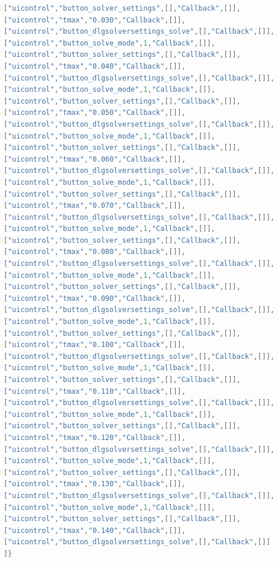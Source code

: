 \documentclass{article}
\begin{document}
\begin{lstlisting}[language=C]
["uicontrol","button_solver_settings",[],"Callback",[]],
["uicontrol","tmax","0.030","Callback",[]],
["uicontrol","button_dlgsolversettings_solve",[],"Callback",[]],
["uicontrol","button_solve_mode",1,"Callback",[]],
["uicontrol","button_solver_settings",[],"Callback",[]],
["uicontrol","tmax","0.040","Callback",[]],
["uicontrol","button_dlgsolversettings_solve",[],"Callback",[]],
["uicontrol","button_solve_mode",1,"Callback",[]],
["uicontrol","button_solver_settings",[],"Callback",[]],
["uicontrol","tmax","0.050","Callback",[]],
["uicontrol","button_dlgsolversettings_solve",[],"Callback",[]],
["uicontrol","button_solve_mode",1,"Callback",[]],
["uicontrol","button_solver_settings",[],"Callback",[]],
["uicontrol","tmax","0.060","Callback",[]],
["uicontrol","button_dlgsolversettings_solve",[],"Callback",[]],
["uicontrol","button_solve_mode",1,"Callback",[]],
["uicontrol","button_solver_settings",[],"Callback",[]],
["uicontrol","tmax","0.070","Callback",[]],
["uicontrol","button_dlgsolversettings_solve",[],"Callback",[]],
["uicontrol","button_solve_mode",1,"Callback",[]],
["uicontrol","button_solver_settings",[],"Callback",[]],
["uicontrol","tmax","0.080","Callback",[]],
["uicontrol","button_dlgsolversettings_solve",[],"Callback",[]],
["uicontrol","button_solve_mode",1,"Callback",[]],
["uicontrol","button_solver_settings",[],"Callback",[]],
["uicontrol","tmax","0.090","Callback",[]],
["uicontrol","button_dlgsolversettings_solve",[],"Callback",[]],
["uicontrol","button_solve_mode",1,"Callback",[]],
["uicontrol","button_solver_settings",[],"Callback",[]],
["uicontrol","tmax","0.100","Callback",[]],
["uicontrol","button_dlgsolversettings_solve",[],"Callback",[]],
["uicontrol","button_solve_mode",1,"Callback",[]],
["uicontrol","button_solver_settings",[],"Callback",[]],
["uicontrol","tmax","0.110","Callback",[]],
["uicontrol","button_dlgsolversettings_solve",[],"Callback",[]],
["uicontrol","button_solve_mode",1,"Callback",[]],
["uicontrol","button_solver_settings",[],"Callback",[]],
["uicontrol","tmax","0.120","Callback",[]],
["uicontrol","button_dlgsolversettings_solve",[],"Callback",[]],
["uicontrol","button_solve_mode",1,"Callback",[]],
["uicontrol","button_solver_settings",[],"Callback",[]],
["uicontrol","tmax","0.130","Callback",[]],
["uicontrol","button_dlgsolversettings_solve",[],"Callback",[]],
["uicontrol","button_solve_mode",1,"Callback",[]],
["uicontrol","button_solver_settings",[],"Callback",[]],
["uicontrol","tmax","0.140","Callback",[]],
["uicontrol","button_dlgsolversettings_solve",[],"Callback",[]]
]}
\end{lstlisting}
\end{document}
